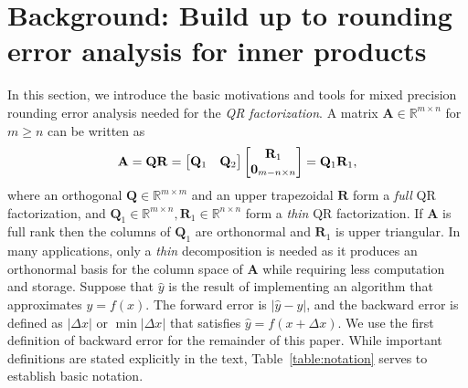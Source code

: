 \documentclass[review,onefignum,onetabnum]{siamart190516}
\newcommand{\R}{\mathbb{R}}
\newcommand{\bb}[1]{\mathbf{#1}}
\begin{document}
\section{Background: Build up to rounding error analysis for inner products}\label{sec:background}
In this section, we introduce the basic motivations and tools for mixed precision rounding error analysis needed for the {\it QR factorization}.
A matrix $\bb{A} \in \R^{m \times n}$ for $m\geq n$ can be written as
\[\bb{A} = \bb{QR}=\begin{bmatrix}\bb{Q}_{1} & \bb{Q}_2\end{bmatrix} \begin{bmatrix}\bb{R}_{1} \\ \bb{0}_{m-n \times n}\end{bmatrix} = \bb{Q}_{1}\bb{R}_{1},\vspace{-0.3cm}
\]
where an orthogonal $\bb{Q}\in\R^{m\times m}$ and an upper trapezoidal $\bb{R}$ form a \emph{full} QR factorization, and $\bb{Q}_{1}\in\R^{m\times n},\bb{R}_{1}\in\R^{n\times n}$ form a \emph{thin} QR factorization.
If $\bb{A}$ is full rank then the columns of $\bb{Q}_{1}$ are orthonormal
and $\bb{R}_1$ is upper triangular.
In many applications, only a \emph{thin} decomposition is needed as it produces an orthonormal basis for the column space of $\bb{A}$ while requiring less computation and storage.
Suppose that $\hat{y}$ is the result of implementing an algorithm that approximates $y=f(x)$.
The forward error is $|\hat{y}-y|$, and the backward error is defined as $|\Delta x|$ or $\min |\Delta x|$ that satisfies $\hat{y}=f(x+\Delta x)$. 
We use the first definition of backward error for the remainder of this paper. 
While important definitions are stated explicitly in the text, Table~\ref{table:notation} serves to establish basic notation.
%
\end{document}
